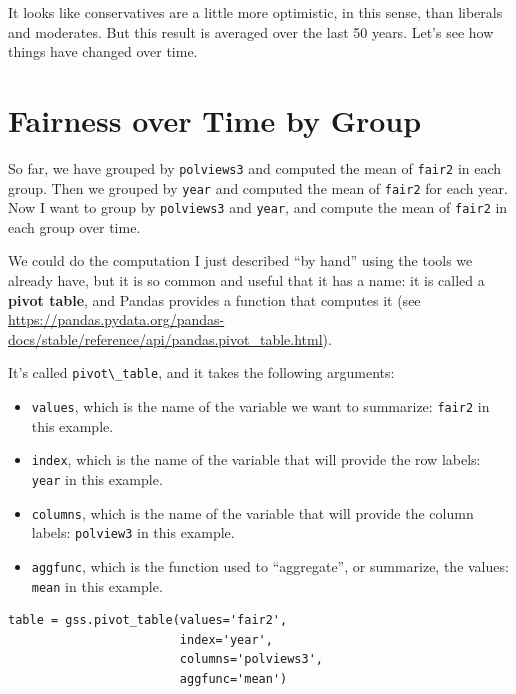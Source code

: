 It looks like conservatives are a little more optimistic, in this sense,
than liberals and moderates. But this result is averaged over the last
50 years. Let's see how things have changed over time.

\hypertarget{fairness-over-time-by-group}{%
\section{Fairness over Time by
Group}\label{fairness-over-time-by-group}}

So far, we have grouped by \passthrough{\lstinline!polviews3!} and
computed the mean of \passthrough{\lstinline!fair2!} in each group. Then
we grouped by \passthrough{\lstinline!year!} and computed the mean of
\passthrough{\lstinline!fair2!} for each year. Now I want to group by
\passthrough{\lstinline!polviews3!} and \passthrough{\lstinline!year!},
and compute the mean of \passthrough{\lstinline!fair2!} in each group
over time.

We could do the computation I just described ``by hand'' using the tools
we already have, but it is so common and useful that it has a name: it
is called a \textbf{pivot table}, and Pandas provides a function that
computes it (see
\url{https://pandas.pydata.org/pandas-docs/stable/reference/api/pandas.pivot_table.html}).

It's called \passthrough{\lstinline!pivot\_table!}, and it takes the
following arguments:

\begin{itemize}
\item
  \passthrough{\lstinline!values!}, which is the name of the variable we
  want to summarize: \passthrough{\lstinline!fair2!} in this example.
\item
  \passthrough{\lstinline!index!}, which is the name of the variable
  that will provide the row labels: \passthrough{\lstinline!year!} in
  this example.
\item
  \passthrough{\lstinline!columns!}, which is the name of the variable
  that will provide the column labels:
  \passthrough{\lstinline!polview3!} in this example.
\item
  \passthrough{\lstinline!aggfunc!}, which is the function used to
  ``aggregate'', or summarize, the values:
  \passthrough{\lstinline!mean!} in this example.
\end{itemize}

\begin{lstlisting}[]
table = gss.pivot_table(values='fair2', 
                        index='year', 
                        columns='polviews3', 
                        aggfunc='mean')
\end{lstlisting}

